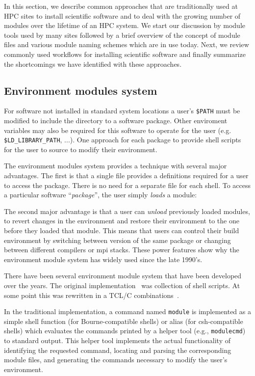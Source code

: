 In this section, we describe common approaches that are traditionally
used at HPC sites to install scientific software and to deal with the
growing number of modules over the lifetime of an HPC system. We start
our discussion by module tools used by many sites followed by a brief
overview of the concept of module files and various module naming
schemes which are in use today.  Next, we review commonly used
workflows for installing scientific software and finally summarize the
shortcomings we have identified with these approaches.

\subsection{Environment modules system}

For software not installed in standard system locations a user's \texttt{\$PATH}
must be modified to include the directory to a software package.  Other enviroment
variables may also be required for this software to operate for the
user (e.g. \texttt{\$LD\_LIBRARY\_PATH}, ...).  One approach for each package to
provide shell scripts for the user to source to modify their
environment. 
  
The environment modules system provides a technique with several major
advantages. The first is that a single file provides a definitions
required for a user to access the package.  There is no need for a
separate file for each shell.  To access a particular software
``\emph{package}'', the user simply \emph{loads} a module:
{\small
\begin{alltt}
    % module load \emph{package}
\end{alltt}
}
\noindent
The second major advantage is that a user can \emph{unload} previously
loaded modules, to revert changes in the environment and restore their
environment to the one before they loaded that module.  This means
that users can control their build environment by switching between
version of the same package or changing between different compilers or
mpi stacks.  These power features show why the environment module
system has widely used since the late 1990's.

There have been several environment module system that have been
developed over the years.  The original
implementation~\cite{furlani91} was collection of shell scripts.  At
some point this was rewritten in a TCL/C combinations~\cite{em}. 

In the traditional implementation, a command named \texttt{module}
is implemented as a simple shell function (for Bourne-compatible shells) or
alias (for csh-compatible shells) which evaluates the commands printed by a
helper tool (e.g., \texttt{modulecmd}) to standard output. This helper tool
implements the actual functionality of identifying the requested command,
locating and parsing the corresponding module files, and generating the
commands necessary to modify the user's environment.


